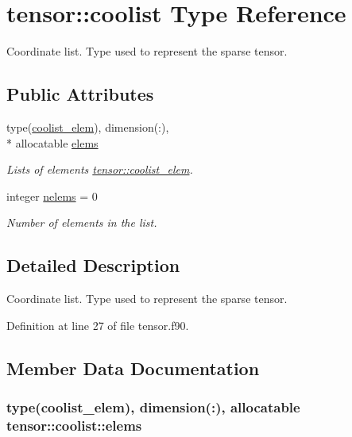 \hypertarget{structtensor_1_1coolist}{\section{tensor\-:\-:coolist Type Reference}
\label{structtensor_1_1coolist}
}


Coordinate list. Type used to represent the sparse tensor.  


\subsection*{Public Attributes}
\begin{DoxyCompactItemize}
\item 
type(\hyperlink{structtensor_1_1coolist__elem}{coolist\-\_\-elem}), dimension(\-:), \\*
allocatable \hyperlink{structtensor_1_1coolist_a49ece7bfa6e6e37b4223a1c63b5c7839}{elems}
\begin{DoxyCompactList}\small\item\em Lists of elements \hyperlink{structtensor_1_1coolist__elem}{tensor\-::coolist\-\_\-elem}. \end{DoxyCompactList}\item 
integer \hyperlink{structtensor_1_1coolist_aac72e7727f1b161da2b9d54e25eb7aae}{nelems} = 0
\begin{DoxyCompactList}\small\item\em Number of elements in the list. \end{DoxyCompactList}\end{DoxyCompactItemize}


\subsection{Detailed Description}
Coordinate list. Type used to represent the sparse tensor. 

Definition at line 27 of file tensor.\-f90.



\subsection{Member Data Documentation}
\hypertarget{structtensor_1_1coolist_a49ece7bfa6e6e37b4223a1c63b5c7839}{
\subsubsection[{elems}]{\setlength{\rightskip}{0pt plus 5cm}type({\bf coolist\-\_\-elem}), dimension(\-:), allocatable tensor\-::coolist\-::elems}}\label{structtensor_1_1coolist_a49ece7bfa6e6e37b4223a1c63b5c7839}


